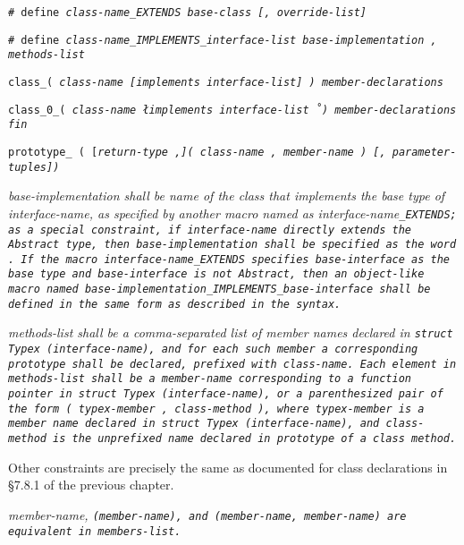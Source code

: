 
\tt{# define} \it{class-name}\tt{_EXTENDS}
\it{base-class} [\tt{,} \it{override-list}]

\tt{# define} \it{class-name}\tt{_IMPLEMENTS_}\it{interface-list}
\it{base-implementation} \tt{,} \it{methods-list}

\tt{class_}\s\s\s\tt{(} \it{class-name} [\tt{implements}
\it{interface-list}]   \tt{)} \it{member-declarations} 

\tt{class_0_}\s\tt{(}  \it{class-name} \l\tt{implements}
\it{interface-list}\r\ \tt{)} \it{member-declarations}  \tt{fin}

\tt{prototype_ (} [\it{return-type} \tt{,}]\s\tt{(} \it{class-name}
\tt{,} \it{member-name} \tt{)} [\tt{,} \it{parameter-tuples}]\s\tt{)}\\


\it{base-implementation} shall be name of the class that implements
the base type of \it{interface-name}, as specified by another macro
named as \it{interface-name}\tt{_EXTENDS}; as a special constraint,
if \it{interface-name} directly extends the \tt{Abstract} type,
then \it{base-implementation} shall be specified as the word .
If the macro \it{interface-name}\tt{_EXTENDS} specifies \it{base-interface} as
the base type and \it{base-interface} is not \tt{Abstract}, then an object-like
macro named \it{base-implementation}\tt{_IMPLEMENTS_}\it{base-interface}
shall be defined in the same form as described in the syntax.

\it{methods-list} shall be a comma-separated list of member names declared
in \tt{struct Typex (}\it{interface-name}\tt{)}, and for each such member
a corresponding prototype shall be declared, prefixed with \it{class-name}.
Each element in \it{methods-list} shall be a
\it{member-name} corresponding to a function pointer in
\tt{struct Typex (}\it{interface-name}\tt{)}, or a parenthesized pair of the form
\tt{(} \it{typex-member} \tt{,} \it{class-method} \tt{)}, where \it{typex-member}
is a member name declared in \tt{struct Typex (}\it{interface-name}\tt{)}, and
\it{class-method} is the unprefixed name declared in prototype of a class method.

Other constraints are precisely the same as documented
for class declarations in \S 7.8.1 of the previous chapter.

\note \it{member-name},
\tt{(}\it{member-name}\tt{)}, and \tt{(}\it{member-name}\tt{,} \it{member-name}\tt{)}
are equivalent in \it{members-list}.

